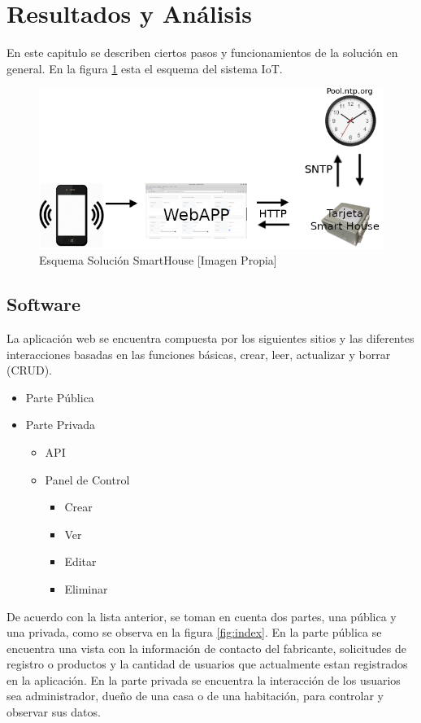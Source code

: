 \section{Resultados y Análisis}

En este capitulo se describen ciertos pasos y funcionamientos de la solución en general. En la figura \ref{fig:iot} esta el esquema del sistema IoT.\\

\begin{figure}[!t]
	\centering
	\caption{Esquema Solución SmartHouse [Imagen Propia]}
	\label{fig:iot}
	\includegraphics[width=0.8\linewidth]{Imagenes/IOT}
\end{figure}

\subsection{Software}

 La aplicación web se encuentra compuesta por los siguientes sitios y las diferentes interacciones basadas en las funciones básicas, crear, leer, actualizar y borrar (CRUD).\\

\begin{itemize}
	\item Parte Pública
	\item Parte Privada
	\begin{itemize}
		\item API
		\item Panel de Control
		\begin{itemize}
			\item Crear
			\item Ver
			\item Editar
			\item Eliminar 
		\end{itemize}
	\end{itemize}
\end{itemize}

De acuerdo con la lista anterior, se toman en cuenta dos partes, una pública y una privada, como se observa en la figura \ref{fig:index}. En la parte pública se encuentra una vista con la información de contacto del fabricante, solicitudes de registro o productos y la cantidad de usuarios que actualmente estan registrados en la aplicación. En la parte privada se encuentra la interacción de los usuarios sea administrador, dueño de una casa o de una habitación, para controlar y observar sus datos.\\

